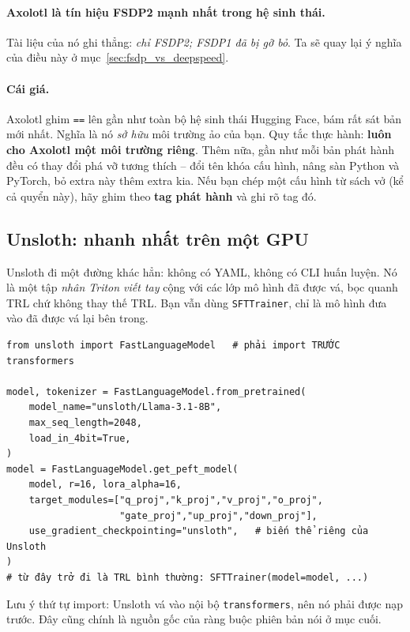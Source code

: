 \paragraph{Axolotl là tín hiệu FSDP2 mạnh nhất trong hệ sinh thái.} Tài liệu của nó ghi thẳng: \emph{chỉ FSDP2; FSDP1 đã bị gỡ bỏ}. Ta sẽ quay lại ý nghĩa của điều này ở mục~\ref{sec:fsdp_vs_deepspeed}.

\paragraph{Cái giá.} Axolotl ghim \texttt{==} lên gần như toàn bộ hệ sinh thái Hugging Face, bám rất sát bản mới nhất. Nghĩa là nó \emph{sở hữu} môi trường ảo của bạn. Quy tắc thực hành: \textbf{luôn cho Axolotl một môi trường riêng}. Thêm nữa, gần như mỗi bản phát hành đều có thay đổi phá vỡ tương thích -- đổi tên khóa cấu hình, nâng sàn Python và PyTorch, bỏ extra này thêm extra kia. Nếu bạn chép một cấu hình từ sách vở (kể cả quyển này), hãy ghim theo \textbf{tag phát hành} và ghi rõ tag đó.

\subsection{Unsloth: nhanh nhất trên một GPU}
\label{ssec:unsloth}

Unsloth đi một đường khác hẳn: không có YAML, không có CLI huấn luyện. Nó là một tập \emph{nhân Triton viết tay} cộng với các lớp mô hình đã được vá, bọc quanh TRL chứ không thay thế TRL. Bạn vẫn dùng \texttt{SFTTrainer}, chỉ là mô hình đưa vào đã được vá lại bên trong.

\begin{verbatim}
from unsloth import FastLanguageModel   # phải import TRƯỚC transformers

model, tokenizer = FastLanguageModel.from_pretrained(
    model_name="unsloth/Llama-3.1-8B",
    max_seq_length=2048,
    load_in_4bit=True,
)
model = FastLanguageModel.get_peft_model(
    model, r=16, lora_alpha=16,
    target_modules=["q_proj","k_proj","v_proj","o_proj",
                    "gate_proj","up_proj","down_proj"],
    use_gradient_checkpointing="unsloth",   # biến thể riêng của Unsloth
)
# từ đây trở đi là TRL bình thường: SFTTrainer(model=model, ...)
\end{verbatim}

\noindent Lưu ý thứ tự import: Unsloth vá vào nội bộ \texttt{transformers}, nên nó phải được nạp trước. Đây cũng chính là nguồn gốc của ràng buộc phiên bản nói ở mục cuối.

